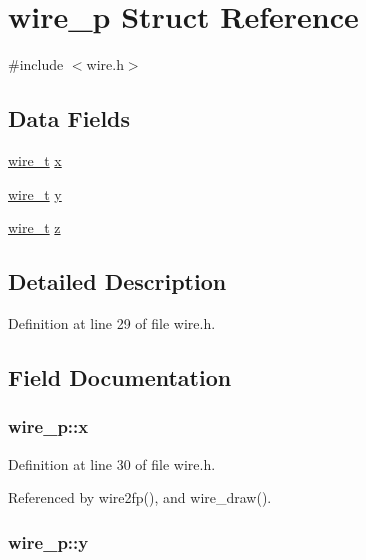 \hypertarget{structwire__p}{\section{wire\-\_\-p Struct Reference}
\label{structwire__p}
}


{\ttfamily \#include $<$wire.\-h$>$}

\subsection*{Data Fields}
\begin{DoxyCompactItemize}
\item 
\hyperlink{wire_8h_ace84d5e6e326f6a52d978bd9900baee6}{wire\-\_\-t} \hyperlink{structwire__p_a7a555c323bd3699ff2db08a3b3e791ed}{x}
\item 
\hyperlink{wire_8h_ace84d5e6e326f6a52d978bd9900baee6}{wire\-\_\-t} \hyperlink{structwire__p_a32b151309922af59db0cafea09e77b67}{y}
\item 
\hyperlink{wire_8h_ace84d5e6e326f6a52d978bd9900baee6}{wire\-\_\-t} \hyperlink{structwire__p_a423cfb83825fc447478c866e4c2f6520}{z}
\end{DoxyCompactItemize}


\subsection{Detailed Description}


Definition at line 29 of file wire.\-h.



\subsection{Field Documentation}
\hypertarget{structwire__p_a7a555c323bd3699ff2db08a3b3e791ed}{
\subsubsection[{x}]{ wire\-\_\-p\-::x}}\label{structwire__p_a7a555c323bd3699ff2db08a3b3e791ed}


Definition at line 30 of file wire.\-h.



Referenced by wire2fp(), and wire\-\_\-draw().

\hypertarget{structwire__p_a32b151309922af59db0cafea09e77b67}{
\subsubsection[{y}]{ wire\-\_\-p\-::y}}\label{structwire__p_a32b151309922af59db0cafea09e77b67}



